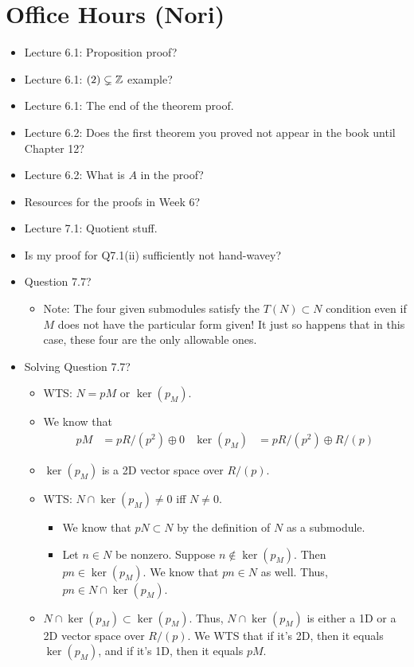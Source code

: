 \documentclass[../notes.tex]{subfiles}
\begin{document}
\section{Office Hours (Nori)}
\begin{itemize}
    \item {}Lecture 6.1: Proposition proof?
    \item Lecture 6.1: $(2)\subsetneq\mathbb{Z}$ example?
    \item Lecture 6.1: The end of the theorem proof.
    \item Lecture 6.2: Does the first theorem you proved not appear in the book until Chapter 12?
    \item Lecture 6.2: What is $A$ in the proof?
    \item Resources for the proofs in Week 6?
    \item Lecture 7.1: Quotient stuff.
    \item Is my proof for Q7.1(ii) sufficiently not hand-wavey?
    \item Question 7.7?
    \begin{itemize}
        \item Note: The four given submodules satisfy the $T(N)\subset N$ condition even if $M$ does not have the particular form given! It just so happens that in this case, these four are the only allowable ones.
    \end{itemize}
    \item Solving Question 7.7?
    \begin{itemize}
        \item WTS: $N=pM$ or $\ker(p_M)$.
        \item We know that
        \begin{align*}
            pM &= pR/(p^2)\oplus 0&
            \ker(p_M) &= pR/(p^2)\oplus R/(p)
        \end{align*}
        \item $\ker(p_M)$ is a 2D vector space over $R/(p)$.
        \item WTS: $N\cap\ker(p_M)\neq 0$ iff $N\neq 0$.
        \begin{itemize}
            \item We know that $pN\subset N$ by the definition of $N$ as a submodule.
            \item Let $n\in N$ be nonzero. Suppose $n\notin\ker(p_M)$. Then $pn\in\ker(p_M)$. We know that $pn\in N$ as well. Thus, $pn\in N\cap\ker(p_M)$.
        \end{itemize}
        \item $N\cap\ker(p_M)\subset\ker(p_M)$. Thus, $N\cap\ker(p_M)$ is either a 1D or a 2D vector space over $R/(p)$. We WTS that if it's 2D, then it equals $\ker(p_M)$, and if it's 1D, then it equals $pM$.

\end{itemize}
\end{itemize}
\end{document}
